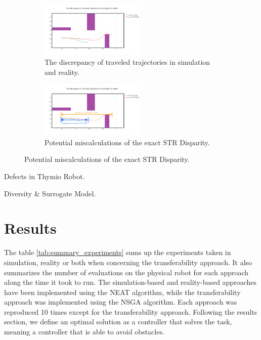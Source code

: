 \begin{figure}[H]
    \centering
    \begin{subfigure}[b]{0.8\textwidth}
    	\centering
        \includegraphics[width=5cm]{include/images/trajectory_discrepancy.PNG}
        \caption{The discrepancy of traveled trajectories in simulation and reality.}
        \label{fig:trajectory_discrepancy}
    \end{subfigure}
    \begin{subfigure}[b]{0.8\textwidth}
    	\centering
        \includegraphics[width=5cm]{include/images/trajectory_discrepancy_wrong_measure.PNG}
        \caption{Potential miscalculations of the exact STR Disparity.}
        \label{fig:trajectory_discrepancy_wrong_measure}
    \end{subfigure}
	\label{fig:real_based_resultsI}
\end{figure}

\item{Defects in Thymio Robot}.

\item{Diversity & Surrogate Model}.

\section{Results}

The table \ref{tab:summary_experiments} sums up the experiments taken in simulation, reality or both when concerning the transferability approach. It also summarizes the number of evaluations on the physical robot for each approach along the time it took to run. The simulation-based and reality-based approaches have been implemented using the NEAT algorithm, while the transferability approach was implemented using the NSGA algorithm. Each approach was reproduced 10 times except for the transferability approach. Following the results section, we define an optimal solution as a controller that solves the task, meaning a controller that is able to avoid obstacles.


